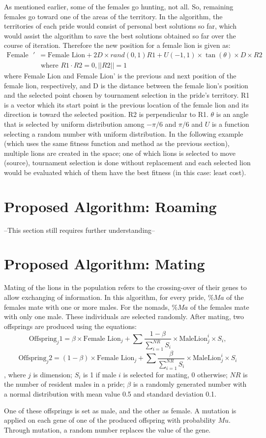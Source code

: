 As mentioned earlier, some of the females go hunting, not all. So, remaining females go toward one of the areas of the territory. In the algorithm, the territories of each pride would consist of personal best solutions so far, which would assist the algorithm to save the best solutions obtained so far over the course of iteration.
Therefore the new position for a female lion is given as:
\begin{align*}
\text{Female Lion}' &= \text{Female Lion} + 2D \times rand(0,1){R1} + U(-1,1) \times \tan(\theta) \times D \times {R2} \\
&\text{  where } R1 \cdot R2 = 0, ||R2|| = 1
\end{align*}
where Female Lion and Female Lion' is the previous and next position of the female lion, respectively, and D is the distance between the female lion's position and the selected point chosen by tournament selection in the pride's territory.
{R1} is a vector which its start point is the previous location of the female lion and its direction is toward the selected position. {R2} is perpendicular to {R1}. $\theta$ is an angle that is selected by uniform distribution among $-\pi/6$ and $\pi/6$ and $U$ is a function selecting a random number with uniform distribution.
In the following example (which uses the same fitness function and method as the previous section), multiple lions are created in the space; one of which lions is selected to move (source), tournament selection is done without replacement and each selected lion would be evaluated which of them have the best fitness (in this case: least cost).


\section{Proposed Algorithm: Roaming}

--This section still requires further understanding--

\section{Proposed Algorithm: Mating}
Mating of the lions in the population refers to the crossing-over of their genes to allow exchanging of information. In this algorithm, for every pride, $\%Ma$ of the females mate with one or more males. For the nomads, $\%Ma$ of the females mate with only one male. These individuals are selected randomly. After mating, two offsprings are produced using the equations: $$\text{Offspring}_j\text{1}=\beta \times \text{Female Lion}_j +\sum\frac{1-\beta}{\sum_{i=1}^{NR}S_i}\times\text{MaleLion}_j^i\times S_i,$$ $$\text{Offspring}_j\text{2}=(1-\beta) \times \text{Female Lion}_j +\sum\frac{\beta}{\sum_{i=1}^{NR}S_i}\times\text{MaleLion}_j^i\times S_i$$, where $j$ is dimension; $S_i$ is 1 if male $i$ is selected for mating, 0 otherwise; $NR$ is the number of resident males in a pride; $\beta$ is a randomly generated number with a normal distribution with mean value 0.5 and standard deviation 0.1.

One of these offsprings is set as male, and the other as female. A mutation is applied on each gene of one of the produced offspring with probability $Mu$. Through mutation, a random number replaces the value of the gene.
